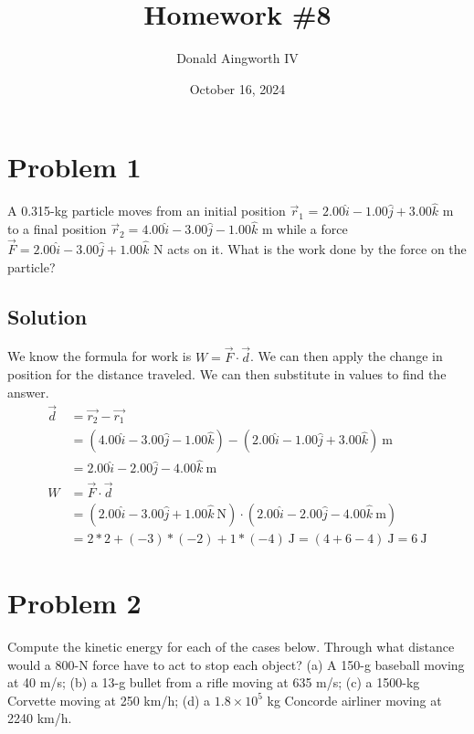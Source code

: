 \documentclass[12pt]{article}
\title{Homework \#8}
\author{Donald Aingworth IV}
\date{October 16, 2024}
\begin{document}

\maketitle

\pagebreak
\section*{Problem 1}
A 0.315-kg particle moves from an initial position $\vec{r}_1$ = $2.00 \hat{i} - 1.00 \hat{j} + 3.00 \hat{k}$ m to a final position $\vec{r}_2 = 4.00 \hat{i} - 3.00 \hat{j} - 1.00 \hat{k}$ m while a force $\vec{F} = 2.00 \hat{i} - 3.00 \hat{j} + 1.00 \hat{k}$ N acts on it. What is the work done by the force on the particle?

\subsection*{Solution}
We know the formula for work is $W = \vec{F} \cdot \vec{d}$. We can then apply the change in position for the distance traveled. We can then substitute in values to find the answer.
\begin{align*}
    \vec{d} &= \vec{r_2} - \vec{r_1}\\
            &= (4.00 \hat{i} - 3.00 \hat{j} - 1.00 \hat{k}) - (2.00 \hat{i} - 1.00 \hat{j} + 3.00 \hat{k})\ \unit{\meter}\\
            &= 2.00 \hat{i} - 2.00 \hat{j} - 4.00 \hat{k}\ \unit{\meter}\\
    W   &= \vec{F} \cdot \vec{d}\\
        &= (2.00 \hat{i} - 3.00 \hat{j} + 1.00 \hat{k}\ \unit{\newton}) \cdot (2.00 \hat{i} - 2.00 \hat{j} - 4.00 \hat{k}\ \unit{\meter})\\
        &= 2*2 + (-3)*(-2) + 1*(-4)\ \unit{\joule} 
        = (4 + 6 - 4)\ \unit{\joule}
        = \boxed{ 6\ \unit{\joule} }
\end{align*}

\pagebreak
\section*{Problem 2}
Compute the kinetic energy for each of the cases below. Through what distance would a 800-N force have to act to stop each object? (a) A 150-g baseball moving at 40 m/s; (b) a 13-g bullet from a rifle moving at 635 m/s; (c) a 1500-kg Corvette moving at 250 km/h; (d) a $1.8 \times 10^5$ kg Concorde airliner moving at 2240 km/h.
\end{document}
